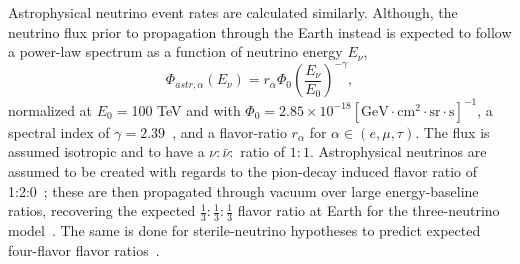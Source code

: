 \documentclass[main.tex]{subfiles}
\begin{document}
Astrophysical neutrino event rates are calculated similarly. Although, the neutrino flux prior to propagation through the Earth instead is expected to follow a power-law spectrum as a function of neutrino energy $E_{\nu}$, 
\begin{equation}
\Phi_{astr,\alpha}(E_{\nu}) = r_{\alpha}\Phi_{0}\left(\dfrac{E_{\nu}}{E_{0}}\right)^{-\gamma},
\end{equation}
normalized at $E_{0}=$100 TeV and with $\Phi_{0}=2.85\times 10^{-18}[\text{GeV}\cdot\text{cm}^{2}\cdot\text{sr}\cdot\text{s}]^{-1}$, a spectral index of $\gamma=2.39$~\cite{Aartsen_2020_prd}, and a flavor-ratio $r_{\alpha}$ for $\alpha\in( e,\mu,\tau)$. The flux is assumed isotropic and to have a $\nu:\bar{\nu}:$ ratio of $1:1$. 
Astrophysical neutrinos are assumed to be created with regards to the pion-decay induced flavor ratio of 1:2:0~\cite{PhysRevD.68.093005,ATHAR_2006}; these are then propagated through vacuum over large energy-baseline ratios, recovering the expected $\tfrac{1}{3}:\tfrac{1}{3}:\tfrac{1}{3}$ flavor ratio at Earth for the three-neutrino model~\cite{Aartsen_2015}.  
The same is done for sterile-neutrino hypotheses to predict expected four-flavor flavor ratios~\cite{carlos2020}. 
\end{document}
